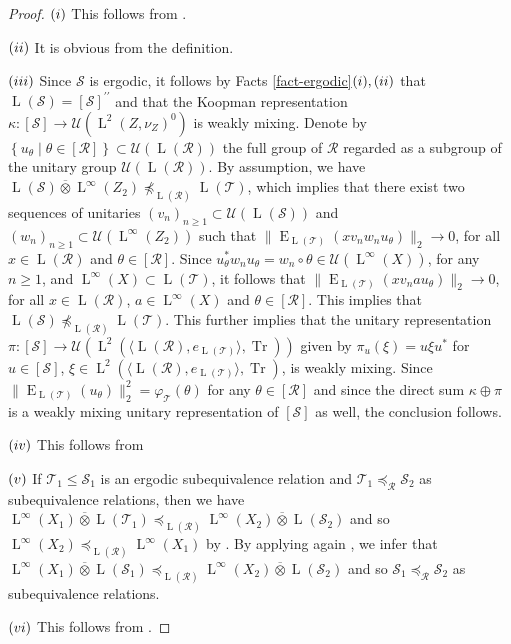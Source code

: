\documentclass[11pt]{amsart}
\numberwithin{equation}{section}
\theoremstyle{plain}
\theoremstyle{definition}
\newcommand{\Tr}{\operatorname{Tr}}
\newcommand{\ovt}{\mathbin{\overline{\otimes}}}
\newcommand{\dpr}{^{\prime\prime}}
\newcommand{\rE}{\operatorname{ E}}
\newcommand{\rL}{\operatorname{L}}
\begin{document}
\begin{proof}
$(\rm i)$ This follows from \cite[Lemma 1.8]{Io11}.

$(\rm ii)$ It is obvious from the definition.

$(\rm iii)$ Since $\mathscr S$ is ergodic, it follows by Facts \ref{fact-ergodic}$(\rm i), (\rm ii)$ that $\rL(\mathscr S) = [\mathscr S]\dpr$ and that the Koopman representation $\kappa : [\mathscr S] \to \mathscr U(\rL^2(Z,\nu_Z)^0)$ is weakly mixing. Denote by $\left\{u_\theta \mid \theta \in [\mathscr R] \right\} \subset \mathscr U(\rL(\mathscr R))$ the full group of $\mathscr R$ regarded as a subgroup of the unitary group $\mathscr U(\rL(\mathscr R))$.
By assumption, we have $\rL(\mathscr S) \ovt \rL^\infty(Z_2) \npreceq_{\rL(\mathscr R)} \rL(\mathscr T)$, which implies that there exist two sequences of unitaries $(v_n)_{n\ge1}\subset \mathscr U(\rL (\mathscr S))$ and $(w_n)_{n\ge 1}\subset \mathscr U(\rL^\infty(Z_2))$ such that $\| \rE_{\rL(\mathscr T)} (x v_n w_n u_\theta) \|_2\to 0$, for all $x\in \rL(\mathscr R)$ and $\theta\in [\mathscr R]$. Since $u_\theta^* w_nu_\theta = w_n\circ \theta \in \mathscr U(\rL^\infty (X))$, for any $n\ge 1$, and $\rL^\infty(X)\subset \rL(\mathscr T)$, it follows that $\| \rE_{\rL(\mathscr T)} (x v_n a u_\theta) \|_2\to 0$, for all $x\in \rL(\mathscr R)$, $a\in \rL^\infty(X)$ and $\theta\in [\mathscr R]$. 
This implies that $\rL(\mathscr S) \npreceq_{\rL(\mathscr R)} \rL(\mathscr T)$. This further implies that the unitary representation $\pi: [\mathscr S]\to \mathscr U(\rL^2(\langle \rL(\mathscr R), e_{\rL(\mathscr T)}\rangle , \Tr))$ given by $\pi_u (\xi)= u \xi u^*$ for $u \in [\mathscr S]$, $\xi \in \rL^2(\langle \rL(\mathscr R), e_{\rL(\mathscr T)}\rangle , \Tr)$, is weakly mixing. Since $\|\rE_{\rL(\mathscr T)}(u_{\theta})\|_2^2=\varphi_{\mathscr T}(\theta)$ for any $\theta\in [\mathscr R]$ and since the direct sum $\kappa\oplus \pi$ is a weakly mixing unitary representation of $[\mathscr S]$ as well, the conclusion follows.

$(\rm iv)$ This follows from \cite[Corollary 3.4]{Sp21}

$(\rm v)$ If $\mathscr T_1 \leq \mathscr S_1$ is an ergodic subequivalence relation and $\mathscr T_1 \preceq_{\mathscr R} \mathscr S_2$ as subequivalence relations, then we have $\rL^\infty(X_1) \ovt \rL(\mathscr T_1) \preceq_{\rL(\mathscr R)} \rL^\infty(X_2) \ovt \rL(\mathscr S_2)$ and so $\rL^\infty(X_2) \preceq_{\rL(\mathscr R)} \rL^\infty(X_1)$ by \cite[Lemma 3.5]{Va07}. By applying again \cite[Lemma 3.5]{Va07}, we infer that $\rL^\infty(X_1) \ovt \rL(\mathscr S_1) \preceq_{\rL(\mathscr R)} \rL^\infty(X_2) \ovt \rL(\mathscr S_2)$ and so $\mathscr S_1 \preceq_{\mathscr R} \mathscr S_2$ as subequivalence relations.

$(\rm vi)$ This follows from \cite[Proposition 3.6]{Sp21}.
\end{proof}
\end{document}
